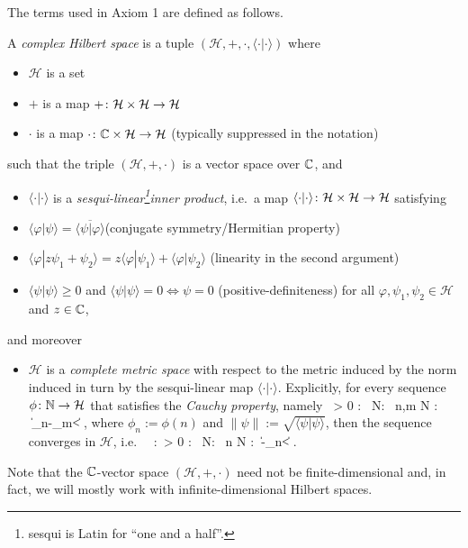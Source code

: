 The terms used in Axiom 1 are defined as follows.

\bd
A \emph{complex Hilbert space} is a tuple $(\mathcal{H},+,\cdot,\langle \cdot | \cdot \rangle)$ where
\begin{itemize}
\item $\mathcal{H}$ is a set
\item $+$ is a map $+\colon\mathcal{H}\times \mathcal{H}\to \mathcal{H}$
\item $\cdot$ is a map $\cdot \colon \mathbb{C} \times \mathcal{H}\to \mathcal{H}$ (typically suppressed in the notation)
\end{itemize}
such that the triple $(\mathcal{H},+,\cdot)$ is a vector space over $\mathbb{C}$, and
\begin{itemize}
\item $\langle \cdot | \cdot \rangle$ is a \emph{sesqui-linear\footnote{sesqui is Latin for ``one and a half''.}inner product}, i.e.\ a map $\langle \cdot | \cdot \rangle\colon\mathcal{H}\times \mathcal{H}\to \mathcal{H}$ satisfying
\ben[label=(\roman*)]
\item $\langle \varphi|\psi\rangle=\overline{\langle \psi|\varphi\rangle}$\hfill (conjugate symmetry/Hermitian property)
\item $\langle \varphi|z\psi_1+\psi_2\rangle=z\langle \varphi|\psi_1\rangle+\langle \varphi|\psi_2\rangle$ \hfill (linearity in the second argument)
\item $\langle \psi | \psi\rangle \geq 0$ and $\langle \psi|\psi\rangle = 0 \Leftrightarrow \psi = 0$ \hfill (positive-definiteness)
\een
for all $\varphi,\psi_1,\psi_2\in\mathcal{H}$ and $z\in \mathbb{C}$,
\end{itemize}
and moreover
\begin{itemize}
\item $\mathcal{H}$ is a \emph{complete metric space} with respect to the metric induced by the norm induced in turn by the sesqui-linear map $\langle \cdot | \cdot \rangle$. Explicitly, for every sequence $\phi\colon \mathbb{N} \to \mathcal{H}$ that satisfies the \emph{Cauchy property}, namely
\bse
\forall \, \varepsilon > 0 : \exists \, N\in \N : \forall \, n,m \geq N : \ \|\phi_n-\phi_m\|< \varepsilon,
\ese
where $\phi_n:=\phi(n)$ and $\|\psi\|:=\sqrt{\langle \psi | \psi \rangle}$, then the sequence converges in $\mathcal{H}$, i.e.\
\bse
\exists \, \varphi\in{}:\forall \, \varepsilon > 0 : \exists \, N\in \N : \forall \, n \geq N : \ \|\varphi-\phi_n\|< \varepsilon.
\ese
\end{itemize}
\ed
Note that the $\mathbb{C}$-vector space $(\mathcal{H},+,\cdot)$ need not be finite-dimensional and, in fact, we will mostly work with infinite-dimensional Hilbert spaces. 

